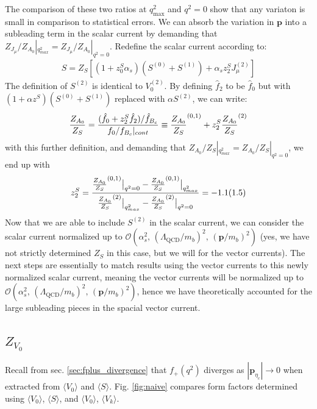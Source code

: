 The comparison of these two ratios at $q^2_{\text{max}}$ and $q^2=0$ show that any variaton is small in comparison to statistical errors. We can absorb the variation in ${\textbf{p}}$ into a subleading term in the scalar current by demanding that $Z_{J_{\mu}}/Z_{A_0}|_{q^2_{max}} = Z_{J_{\mu}}/Z_{A_0}|_{q^2=0}$. Redefine the scalar current according to:
\begin{align}
 S = Z_{S} \left[ (1 + z^{S}_0 \alpha_s)( S^{(0)} + S^{(1)} ) + \alpha_s z^{S}_2 J^{(2)}_{\mu} \right]
\end{align}
The definition of $S^{(2)}$ is identical to $V_0^{(2)}$. %
By defining $\hat{f}_2$ to be $\hat{f}_0$ but with $(1+\alpha z^S)( S^{(0)} + S^{(1)} )$ replaced with $\alpha S^{(2)}$, we can write:
\begin{align}
	{Z_{A_0}\over Z_{S}} = { ( \hat{f}_0 + z^S_2 \hat{f}_2 )/ \hat{f}_{B_c}  \over f_0/f_{B_c}|_{cont} } \equiv {Z_{A_0}\over Z_{S}}^{(0,1)} + z^S_2 {Z_{A_0}\over Z_{S}}^{(2)}
\end{align}
with this further definition, and demanding that ${Z_{A_0}/ Z_{S}}|_{q^2_{max}} = {Z_{A_0}/ Z_{S}}|_{q^2=0}$, we end up with
\begin{align}
	z^S_2 = { {Z_{A_0}\over Z_{S}}^{(0,1)}\big\vert_{q^2=0} - {Z_{A_0}\over Z_{S}}^{(0,1)}\big\vert_{q^2_{max}}
\over {Z_{A_0}\over Z_{S}}^{(2)}\big\vert_{q^2_{max}} - {Z_{A_0}\over Z_{S}}^{(2)}\big\vert_{q^2=0} }
 = -1.1(1.5)
\end{align}
Now that we are able to include $S^{(2)}$ in the scalar current, we can consider the scalar current normalized up to $\mathcal{O}(\alpha_s^2, \,(\Lambda_{\text{QCD}}/m_b)^2, \,({\textbf{p}}/m_b)^2 )$ (yes, we have not strictly determined $Z_S$ in this case, but we will for the vector currents). The next steps are essentially to match results using the vector currents to this newly normalized scalar current, meaning the vector currents will be normalized up to $\mathcal{O}(\alpha_s^2, \,(\Lambda_{\text{QCD}}/m_b)^2, \,({\textbf{p}}/m_b)^2 )$, hence we have theoretically accounted for the large subleading pieces in the spacial vector current.

\subsection{$Z_{V_0}$}
\label{sec:ZV0}

Recall from sec. \ref{sec:fplus_divergence} that $f_+(q^2)$ diverges as $|{\textbf{p}}_{\eta_c}|\to 0$ when extracted from $\langle V_0 \rangle$ and $\langle S \rangle$. Fig. \ref{fig:naive} compares form factors determined using $\langle V_0 \rangle$, $\langle S \rangle$, and $\langle V_0 \rangle$, $\langle V_k \rangle$.

